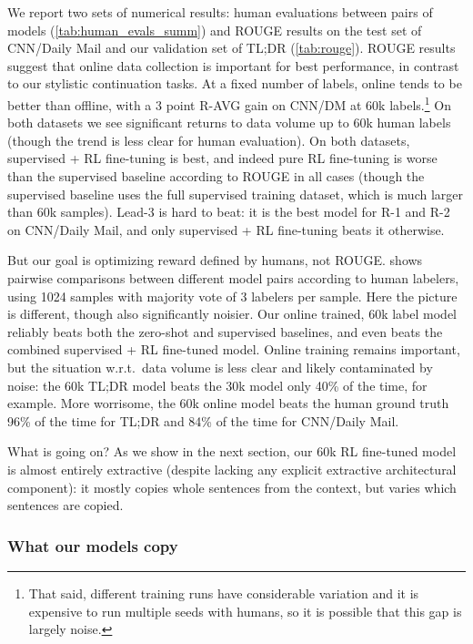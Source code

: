 \documentclass{article}
\begin{document}
We report two sets of numerical results: human evaluations between pairs of models (\cref{tab:human_evals_summ}) and ROUGE results on the test set of CNN/Daily Mail and our validation set of TL;DR (\cref{tab:rouge}).  ROUGE results suggest that online data collection is important for best performance, in contrast to our stylistic continuation tasks.  At a fixed number of labels, online tends to be better than offline, with a 3 point R-AVG gain on CNN/DM at 60k labels.\footnote{That said, different training runs have considerable variation
and it is expensive to run multiple seeds with humans,
so it is possible that this gap is largely noise.}
On both datasets we see significant returns to data volume up to 60k human labels (though the trend is less clear for human evaluation).  On both datasets, supervised + RL fine-tuning is best, and indeed pure RL fine-tuning is worse than the supervised baseline according to ROUGE in all cases (though the supervised baseline uses the full supervised training dataset, which is much larger than 60k samples).  Lead-3 is hard to beat: it is the best model for R-1 and R-2 on CNN/Daily Mail, and only supervised + RL fine-tuning beats it otherwise.

But our goal is optimizing reward defined by humans, not ROUGE.
 shows pairwise comparisons between different model pairs according to human labelers, using 1024 samples with majority vote of 3 labelers per sample. Here the picture is different, though also significantly noisier. Our online trained, 60k label model reliably beats both the zero-shot and supervised baselines, and even beats the combined supervised + RL fine-tuned model.  Online training remains important, but the situation w.r.t.\ data volume is less clear and likely contaminated by noise: the 60k TL;DR model beats the 30k model only 40\% of the time, for example.  More worrisome, the 60k online model beats the human ground truth 96\% of the time for TL;DR and 84\% of the time for CNN/Daily Mail.

What is going on?  As we show in the next section, our 60k RL fine-tuned model is almost entirely extractive (despite lacking any explicit extractive architectural component): it mostly copies whole sentences from the context, but varies which sentences are copied.

\subsubsection{What our models copy \label{sec:copiers}}
\end{document}
